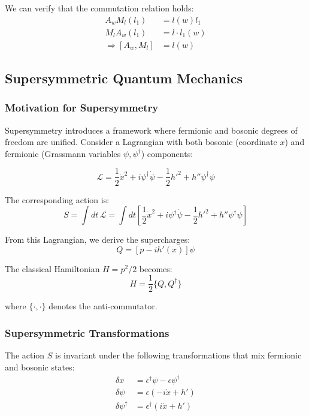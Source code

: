 We can verify that the commutation relation holds:
\begin{align}
A_{w} M_{l} (l_{1}) &= l(w) l_{1} \\
M_{l} A_{w} (l_{1}) &= l \cdot l_{1}(w) \\
\Rightarrow [A_{w}, M_{l}] &= l(w)
\end{align}

\subsection{Supersymmetric Quantum Mechanics}

\subsubsection{Motivation for Supersymmetry}

Supersymmetry introduces a framework where fermionic and bosonic degrees of freedom are unified. Consider a Lagrangian with both bosonic (coordinate $x$) and fermionic (Grassmann variables $\psi, \psi^{\dagger}$) components:

\begin{equation}
\mathcal{L} = \frac{1}{2}\dot{x}^2 + i\psi^{\dagger}\dot{\psi} - \frac{1}{2}h'^2 + h''\psi^{\dagger}\psi
\end{equation}

The corresponding action is:
\begin{equation}
S = \int dt \, \mathcal{L} = \int dt \left[\frac{1}{2}\dot{x}^2 + i\psi^{\dagger}\dot{\psi} - \frac{1}{2}h'^2 + h''\psi^{\dagger}\psi\right]
\end{equation}

From this Lagrangian, we derive the supercharges:
\begin{equation}
Q = \left[ p - i h'(x) \right] \psi
\end{equation}

The classical Hamiltonian $H = p^2/2$ becomes:
\begin{equation}
H = \frac{1}{2} \{Q, Q^{\dagger} \}
\end{equation}

where $\{\cdot, \cdot\}$ denotes the anti-commutator.

\subsubsection{Supersymmetric Transformations}

The action $S$ is invariant under the following transformations that mix fermionic and bosonic states:
\begin{align}
\delta x &= \epsilon^\dagger \psi - \epsilon \psi^\dagger \\
\delta \psi &= \epsilon(-i \dot{x} + h') \\
\delta \psi^\dagger &= \epsilon^\dagger(i \dot{x} + h')
\end{align}

